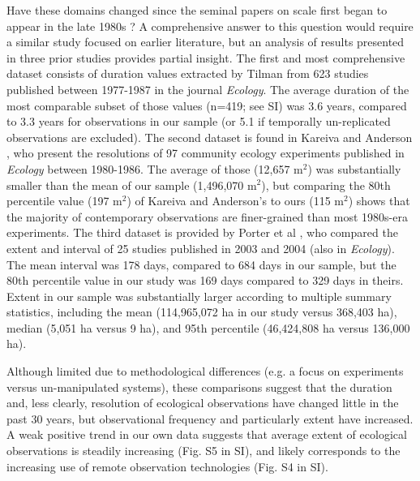 \documentclass[12pt]{article}
\begin{document}
Have these domains changed since the seminal papers on scale first began to appear in the late 1980s \cite{wiens_spatial_1989, levin_problem_1992, tilman_ecological_1989}? A comprehensive answer to this question would require a similar study focused on earlier literature, but an analysis of results presented in three prior studies provides partial insight. The first and most comprehensive dataset consists of duration values extracted by Tilman \cite{tilman_ecological_1989} from 623 studies published between 1977-1987 in the journal \emph{Ecology}. The average duration of the most comparable subset of those values (n=419; see SI) was 3.6 years, compared to 3.3 years for observations in our sample (or 5.1 if temporally un-replicated observations are excluded). The second dataset is found in Kareiva and Anderson \cite{kareiva_spatial_1988}, who present the resolutions of 97 community ecology experiments published in \emph{Ecology} between 1980-1986. The average of those (12,657 m$^2$) was substantially smaller than the mean of our sample (1,496,070 m$^2$), but comparing the 80th percentile value (197 m$^2$) of Kareiva and Anderson's \cite{kareiva_spatial_1988} to ours (115 m$^2$) shows that the majority of contemporary observations are finer-grained than most 1980s-era experiments. The third dataset is provided by Porter et al \cite{porter_wireless_2005}, who compared the extent and interval of 25 studies published in 2003 and 2004 (also in \emph{Ecology}). The mean interval was 178 days, compared to 684 days in our sample, but the 80th percentile value in our study was 169 days compared to 329 days in theirs. Extent in our sample was substantially larger according to multiple summary statistics, including the mean (114,965,072 ha in our study versus 368,403 ha), median (5,051 ha versus 9 ha), and 95th percentile (46,424,808 ha versus 136,000 ha).  

Although limited due to methodological differences (e.g. a focus on experiments versus un-manipulated systems), these comparisons suggest that the duration and, less clearly, resolution of ecological observations have changed little in the past 30 years, but observational frequency and particularly extent have increased. A weak positive trend in our own data suggests that average extent of ecological observations is steadily increasing (Fig. S5 in SI), and likely corresponds to the increasing use of remote observation technologies (Fig. S4 in SI).  
\end{document}
